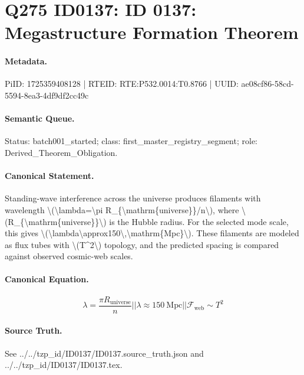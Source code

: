 \section*{Q275 ID0137: ID 0137: Megastructure Formation Theorem}
\paragraph{Metadata.}
PiID: 1725359408128 | RTEID: RTE:P532.0014:T0.8766 | UUID: ae08cf86-58cd-5594-8ea3-4df9df2cc49c

\paragraph{Semantic Queue.}
Status: batch001\_started; class: first\_master\_registry\_segment; role: Derived\_Theorem\_Obligation.

\paragraph{Canonical Statement.}
Standing-wave interference across the universe produces filaments with wavelength \textbackslash{}(\textbackslash{}lambda=\textbackslash{}pi R\_\{\textbackslash{}mathrm\{universe\}\}/n\textbackslash{}), where \textbackslash{}(R\_\{\textbackslash{}mathrm\{universe\}\}\textbackslash{}) is the Hubble radius. For the selected mode scale, this gives \textbackslash{}(\textbackslash{}lambda\textbackslash{}approx150\textbackslash{},\textbackslash{}mathrm\{Mpc\}\textbackslash{}). These filaments are modeled as flux tubes with \textbackslash{}(T\textasciicircum{}2\textbackslash{}) topology, and the predicted spacing is compared against observed cosmic-web scales.

\paragraph{Canonical Equation.}
\[
\lambda=\frac{\pi R_{\mathrm{universe}}}{n} || \lambda \approx 150\ \mathrm{Mpc} || \mathcal{F}_{\mathrm{web}}\sim T^2
\]

\paragraph{Source Truth.}
See ../../tzp\_id/ID0137/ID0137.source\_truth.json and ../../tzp\_id/ID0137/ID0137.tex.
